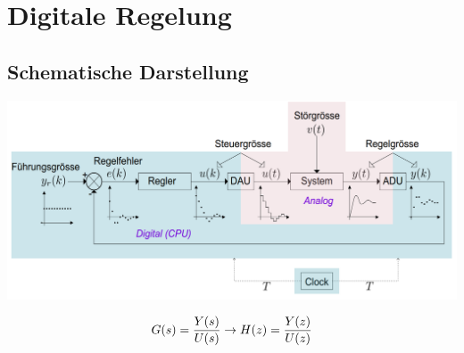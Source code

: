 



\chapter{Digitale Regelung}

\section{Schematische Darstellung}
\begin{center}
	\includegraphics[scale = 0.3]{images/schematische_darstellung.png}
\end{center}
\[
	G(s)=\frac{Y(s)}{U(s)}\\ \rightarrow \\ H(z)=\frac{Y(z)}{U(z)} \\ \\
\]

